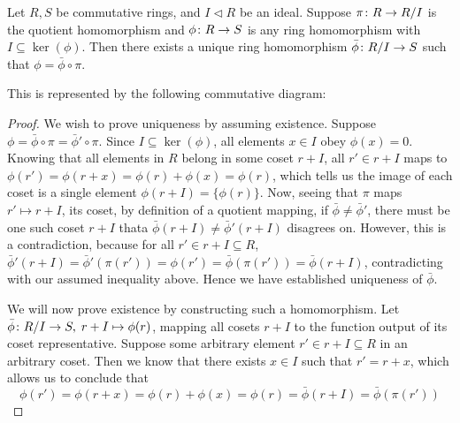 \begin{theorem}\label{thm:univ-prop-quotient-ring}
    Let \(R,S\) be commutative rings,
    and \(I \lhd R\) be an ideal.
    Suppose \(\pi\colon R\to R/I\) is the quotient homomorphism
    and \(\phi\colon R\to S\) is any ring homomorphism
    with \(I \subseteq \ker(\phi)\).
    Then there exists a unique ring homomorphism
    \(\bar{\phi}\colon R/I\to S\) such that \(\phi = \bar{\phi}\circ\pi\).

    This is represented by the following commutative diagram:
    \begin{center}
    \end{center}
\end{theorem}
\begin{proof}
    We wish to prove uniqueness by assuming existence.
    Suppose \(\phi = \bar{\phi}\circ\pi = \bar{\phi}'\circ\pi\).
    Since \(I \subseteq \ker(\phi)\),
    all elements \(x \in I\) obey \(\phi(x) = 0\).
    Knowing that all elements in \(R\) belong in some coset \(r+I\),
    all \(r' \in r+I\) maps to \(\phi(r') = \phi(r+x) = \phi(r)+\phi(x) = \phi(r)\),
    which tells us the image of each coset
    is a single element \(\phi(r+I) = \{\phi(r)\}\).
    Now, seeing that \(\pi \) maps \(r' \mapsto r+I\), its coset,
    by definition of a quotient mapping,
    if \(\bar{\phi} \neq \bar{\phi}'\),
    there must be one such coset \(r+I\)
    thata \(\bar{\phi}(r+I) \neq \bar{\phi}'(r+I)\) disagrees on.
    However, this is a contradiction,
    because for all \(r' \in r+I \subseteq R\),
    \(\bar{\phi}'(r+I) = \bar{\phi}'(\pi(r')) = \phi(r')
    = \bar{\phi}(\pi(r')) = \bar{\phi}(r+I)\),
    contradicting with our assumed inequality above.
    Hence we have established uniqueness of \(\bar{\phi}\).

    We will now prove existence by constructing such a homomorphism.
    Let \(\bar{\phi}\colon R/I\to S,\;r+I\mapsto\phi(r)\),
    mapping all cosets \(r+I\) to the function output of its coset representative.
    Suppose some arbitrary element \(r' \in r+I \subseteq R\)
    in an arbitrary coset.
    Then we know that there exists \(x \in I\) such that \(r' = r+x\),
    which allows us to conclude that
    \begin{equation*}
        \phi(r') = \phi(r+x) = \phi(r) + \phi(x)
        = \phi(r) = \bar{\phi}(r+I) = \bar{\phi}(\pi(r'))
    \end{equation*}
\end{proof}

